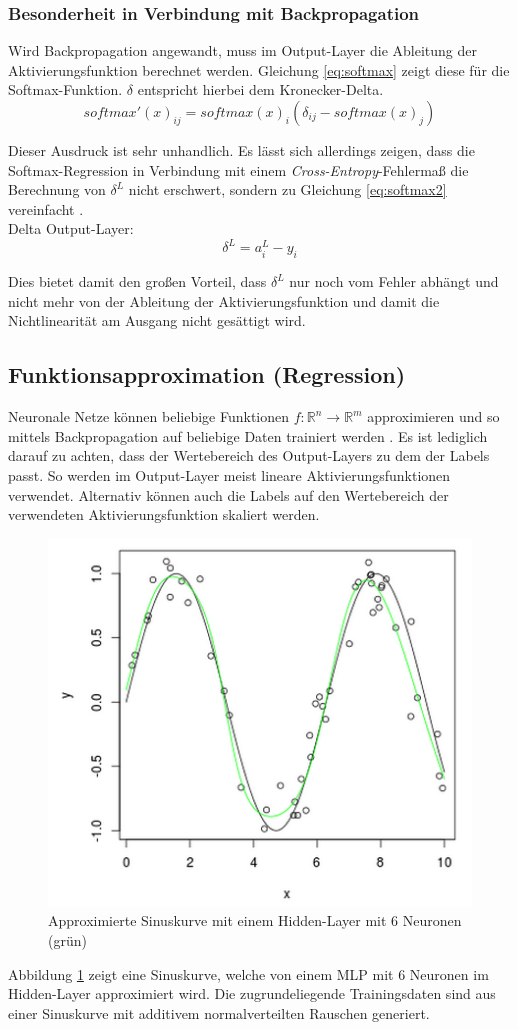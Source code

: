 \subsubsection{Besonderheit in Verbindung mit Backpropagation}
Wird Backpropagation angewandt, muss im Output-Layer die Ableitung der Aktivierungsfunktion berechnet werden. Gleichung \ref{eq:softmax} zeigt diese für die Softmax-Funktion. $\delta$ entspricht hierbei dem Kronecker-Delta.
\begin{equation} 
\label{eq:softmax}
softmax'(x)_{ij} = softmax(x)_i(\delta_{ij} - softmax(x)_j)
\end{equation}

Dieser Ausdruck ist sehr unhandlich. Es lässt sich allerdings zeigen, dass die Softmax-Regression in Verbindung mit einem \textit{Cross-Entropy}-Fehlermaß die Berechnung von $\delta^L$ nicht erschwert, sondern zu Gleichung \ref{eq:softmax2} vereinfacht  \cite[vgl. z. B.][Kap. 6.3.2, S. 167]{Bengio2015}. \\

Delta Output-Layer:
\begin{equation} 
\label{eq:softmax2}
\delta^{L} = a_i^{L} - y_i
\end{equation}

Dies bietet damit den großen Vorteil, dass $\delta^L$ nur noch vom Fehler abhängt und nicht mehr von der Ableitung der Aktivierungsfunktion und damit die Nichtlinearität am Ausgang nicht gesättigt wird.


\subsection{Funktionsapproximation (Regression)}
Neuronale Netze können beliebige Funktionen $f:\mathbb{R}^n \rightarrow \mathbb{R}^m $ approximieren und so mittels Backpropagation auf beliebige Daten trainiert werden \cite[vgl.][S. 269 ff.]{Rojas1996}. Es ist lediglich darauf zu achten, dass der Wertebereich des Output-Layers zu dem der Labels passt. So werden im Output-Layer meist lineare Aktivierungsfunktionen verwendet. Alternativ können auch die Labels auf den Wertebereich der verwendeten Aktivierungsfunktion skaliert werden.

\begin{figure}
\centering
\includegraphics[width=0.5\linewidth]{images/2_sine_nn}
\caption[Approximierte Sinuskurve mit einem Hidden-Layer mit 6 Neuronen (grün)]{Approximierte Sinuskurve mit einem Hidden-Layer mit 6 Neuronen (grün)}
\label{fig:2_sine}
\end{figure}

Abbildung \ref{fig:2_sine} zeigt eine Sinuskurve, welche von einem MLP mit 6 Neuronen im Hidden-Layer approximiert wird. Die zugrundeliegende Trainingsdaten sind aus einer Sinuskurve mit additivem normalverteilten Rauschen generiert. 

